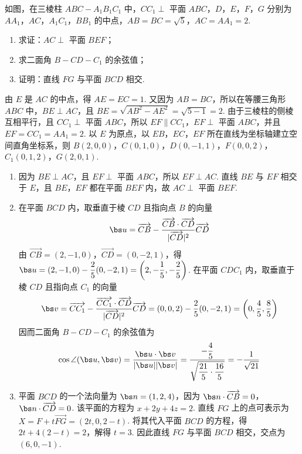 \begin{problem}
如图，在三棱柱 \(ABC-A_1B_1C_1\) 中，\(CC_1\perp\) 平面 \(ABC\)，\(D\)，\(E\)，\(F\)，\(G\) 分别为 \(AA_1\)，\(AC\)，\(A_1C_1\)，\(BB_1\) 的中点，\(AB=BC=\sqrt5\)，\(AC=AA_1=2\).

\begin{enumerate}
    \item 求证：\(AC\perp\) 平面 \(BEF\)；
    \item 求二面角 \(B-CD-C_1\) 的余弦值；
    \item 证明：直线 \(FG\) 与平面 \(BCD\) 相交.
\end{enumerate}

\end{problem}

\begin{solution}
由 \(E\) 是 \(AC\) 的中点，得 \(AE=EC=1\). 又因为 \(AB=BC\)，所以在等腰三角形 \(ABC\) 中，\(BE\perp AC\)，且
    \(BE=\sqrt{AB^2-AE^2}=\sqrt{5-1}=2\).
由于三棱柱的侧棱互相平行，且 \(CC_1\perp\) 平面 \(ABC\)，所以 \(EF\parallel CC_1\)，\(EF\perp\) 平面 \(ABC\)，并且 \(EF=CC_1=AA_1=2\). 以 \(E\) 为原点，以 \(EB\)，\(EC\)，\(EF\) 所在直线为坐标轴建立空间直角坐标系，则
    \(B(2,0,0)\)，\(C(0,1,0)\)，\(D(0,-1,1)\)，\(F(0,0,2)\)，\(C_1(0,1,2)\)，\(G(2,0,1)\).

\begin{enumerate}
    \item 因为 \(BE\perp AC\)，且 \(EF\perp\) 平面 \(ABC\)，所以 \(EF\perp AC\). 直线 \(BE\) 与 \(EF\) 相交于 \(E\)，且 \(BE\)，\(EF\) 都在平面 \(BEF\) 内，故 \(AC\perp\) 平面 \(BEF\).
    \item 在平面 \(BCD\) 内，取垂直于棱 \(CD\) 且指向点 \(B\) 的向量
    \[
    \bs u=\overrightarrow{CB}-\dfrac{\overrightarrow{CB}\cdot\overrightarrow{CD}}{|\overrightarrow{CD}|^2}\overrightarrow{CD}
    \]
    由 \(\overrightarrow{CB}=(2,-1,0)\)，\(\overrightarrow{CD}=(0,-2,1)\)，得 \(\bs u=(2,-1,0)-\dfrac25(0,-2,1)=\left(2,-\dfrac15,-\dfrac25\right)\).
    在平面 \(CDC_1\) 内，取垂直于棱 \(CD\) 且指向点 \(C_1\) 的向量
    \[
    \bs v=\overrightarrow{CC_1}-\dfrac{\overrightarrow{CC_1}\cdot\overrightarrow{CD}}{|\overrightarrow{CD}|^2}\overrightarrow{CD}
    =(0,0,2)-\dfrac25(0,-2,1)=\left(0,\dfrac45,\dfrac85\right)
    \]
    因而二面角 \(B-CD-C_1\) 的余弦值为
    \[
    \cos\angle(\bs u,\bs v)=\dfrac{\bs u\cdot\bs v}{|\bs u||\bs v|}
    =\dfrac{-\dfrac45}{\sqrt{\dfrac{21}{5}\cdot\dfrac{16}{5}}}=-\dfrac1{\sqrt{21}}
    \]
    \item 平面 \(BCD\) 的一个法向量为 \(\bs n=(1,2,4)\)，因为 \(\bs n\cdot\overrightarrow{CB}=0\)，\(\bs n\cdot\overrightarrow{CD}=0\). 该平面的方程为 \(x+2y+4z=2\). 直线 \(FG\) 上的点可表示为 \(X=F+t\overrightarrow{FG}=(2t,0,2-t)\).
    将其代入平面 \(BCD\) 的方程，得 \(2t+4(2-t)=2\)，解得 \(t=3\). 因此直线 \(FG\) 与平面 \(BCD\) 相交，交点为 \((6,0,-1)\).
\end{enumerate}
\end{solution}


